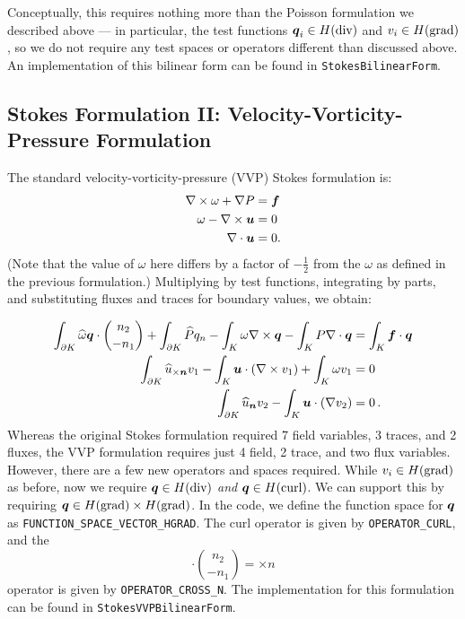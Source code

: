 Conceptually, this requires nothing more than the Poisson formulation we described above --- in particular, the test functions $\NVRvect{q}_{i} \in \NVRHdiv$ and $v_{i} \in \NVRHgrad$, so we do not require any test spaces or operators different than discussed above.  An implementation of this bilinear form can be found in \verb=StokesBilinearForm=.

\subsection{Stokes Formulation II: Velocity-Vorticity-Pressure Formulation}  The standard velocity-vorticity-pressure (VVP) Stokes formulation is:
\begin{align*}
\NVRcurl \omega + \NVRgrad P &= \NVRvect{f}\\
\omega - \NVRcurl \NVRvect{u} &= 0\\
\NVRdiv \NVRvect{u} &= 0.
\end{align*}
(Note that the value of $\omega$ here differs by a factor of $-\frac{1}{2}$ from the $\omega$ as defined in the previous formulation.)  Multiplying by test functions, integrating by parts, and substituting fluxes and traces for boundary values, we obtain:

\begin{align*}
\int_{\partial K} \widehat{\omega} \NVRvect{q} \cdot {n_{2} \choose -n_{1}} + \int_{\partial K} \widehat{P} q_{n} -  \int_{K}\omega \NVRcurl \NVRvect{q} -  \int_{K} P \NVRdiv \NVRvect{q} &= \int_{K} \NVRvect{f} \cdot \NVRvect{q}\\
\int_{\partial K} \widehat{u}_{\times \NVRvect{n}}v_{1} -  \int_{K}\NVRvect{u} \cdot (\NVRcurl v_{1}) +  \int_{K} \omega v_{1} &= 0\\
\int_{\partial K} \widehat{u}_{\NVRvect{n}} v_{2} -  \int_{K}\NVRvect{u} \cdot (\NVRgrad v_{2}) &= 0 \,.
\end{align*}
Whereas the original Stokes formulation required 7 field variables, 3 traces, and 2 fluxes, the VVP formulation requires just 4 field, 2 trace, and two flux variables.  However, there are a few new operators and spaces required.  While $v_{i} \in \NVRHgrad$ as before, now we require $\NVRvect{q} \in \NVRHdiv$ \emph{and} $\NVRvect{q} \in \NVRHcurl$.  We can support this by requiring $\NVRvect{q} \in \NVRHgrad \times \NVRHgrad$.  In the code, we define the function space for $\NVRvect{q}$ as \verb=FUNCTION_SPACE_VECTOR_HGRAD=.  The curl operator is given by \verb=OPERATOR_CURL=, and the \[ \displaystyle \cdot {n_{2} \choose -n_{1}}=\times n\] operator is given by \verb=OPERATOR_CROSS_N=.
The implementation for this formulation can be found in \verb=StokesVVPBilinearForm=.

